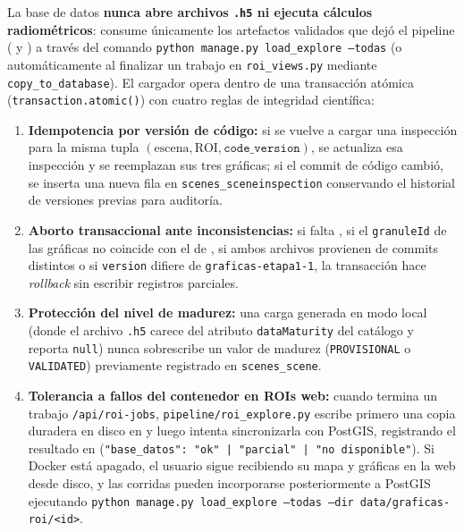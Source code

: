 \documentclass[11pt,a4paper]{article}
\newcommand{\src}[1]{\nolinkurl{#1}}
\begin{document}
La base de datos \textbf{nunca abre archivos \texttt{.h5} ni ejecuta cálculos radiométricos}: consume únicamente
los artefactos validados que dejó el pipeline ( y ) a través del
comando \texttt{python manage.py load\_explore --todas} (o automáticamente al finalizar un trabajo en
\src{roi\_views.py} mediante \texttt{copy\_to\_database}). El cargador opera dentro de una transacción atómica
(\texttt{transaction.atomic()}) con cuatro reglas de integridad científica:
\begin{enumerate}
  \item \textbf{Idempotencia por versión de código:} si se vuelve a cargar una inspección para la misma tupla
        $(\text{escena}, \text{ROI}, \texttt{code\_version})$, se actualiza esa inspección y se reemplazan sus
        tres gráficas; si el commit de código cambió, se inserta una nueva fila en \texttt{scenes\_sceneinspection}
        conservando el historial de versiones previas para auditoría.
  \item \textbf{Aborto transaccional ante inconsistencias:} si falta , si el
        \texttt{granuleId} de las gráficas no coincide con el de , si ambos archivos
        provienen de commits distintos o si \texttt{version} difiere de \texttt{graficas-etapa1-1}, la
        transacción hace \emph{rollback} sin escribir registros parciales.
  \item \textbf{Protección del nivel de madurez:} una carga generada en modo local (donde el archivo \texttt{.h5}
        carece del atributo \texttt{dataMaturity} del catálogo y reporta \texttt{null}) nunca sobrescribe un
        valor de madurez (\texttt{PROVISIONAL} o \texttt{VALIDATED}) previamente registrado en \texttt{scenes\_scene}.
  \item \textbf{Tolerancia a fallos del contenedor en ROIs web:} cuando termina un trabajo \texttt{/api/roi-jobs},
        \src{pipeline/roi\_explore.py} escribe primero una copia duradera en disco en 
        y luego intenta sincronizarla con PostGIS, registrando el resultado en 
        (\texttt{"base\_datos": "ok" | "parcial" | "no disponible"}). Si Docker está apagado, el usuario sigue
        recibiendo su mapa y gráficas en la web desde disco, y las corridas pueden incorporarse posteriormente a
        PostGIS ejecutando \texttt{python manage.py load\_explore --todas --dir data/graficas-roi/<id>}.
\end{enumerate}
\end{document}
